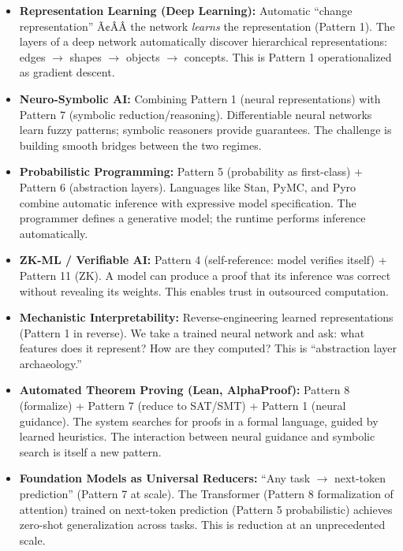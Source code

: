 \begin{itemize}
\item \textbf{Representation Learning (Deep Learning):} Automatic ``change representation'' Ã¢ÂÂ the network \emph{learns} the representation (Pattern 1). The layers of a deep network automatically discover hierarchical representations: edges $\to$ shapes $\to$ objects $\to$ concepts. This is Pattern 1 operationalized as gradient descent.

\item \textbf{Neuro-Symbolic AI:} Combining Pattern 1 (neural representations) with Pattern 7 (symbolic reduction/reasoning). Differentiable neural networks learn fuzzy patterns; symbolic reasoners provide guarantees. The challenge is building smooth bridges between the two regimes.

\item \textbf{Probabilistic Programming:} Pattern 5 (probability as first-class) + Pattern 6 (abstraction layers). Languages like Stan, PyMC, and Pyro combine automatic inference with expressive model specification. The programmer defines a generative model; the runtime performs inference automatically.

\item \textbf{ZK-ML / Verifiable AI:} Pattern 4 (self-reference: model verifies itself) + Pattern 11 (ZK). A model can produce a proof that its inference was correct without revealing its weights. This enables trust in outsourced computation.

\item \textbf{Mechanistic Interpretability:} Reverse-engineering learned representations (Pattern 1 in reverse). We take a trained neural network and ask: what features does it represent? How are they computed? This is ``abstraction layer archaeology.''

\item \textbf{Automated Theorem Proving (Lean, AlphaProof):} Pattern 8 (formalize) + Pattern 7 (reduce to SAT/SMT) + Pattern 1 (neural guidance). The system searches for proofs in a formal language, guided by learned heuristics. The interaction between neural guidance and symbolic search is itself a new pattern.

\item \textbf{Foundation Models as Universal Reducers:} ``Any task $\to$ next-token prediction'' (Pattern 7 at scale). The Transformer (Pattern 8 formalization of attention) trained on next-token prediction (Pattern 5 probabilistic) achieves zero-shot generalization across tasks. This is reduction at an unprecedented scale.


\end{itemize}
